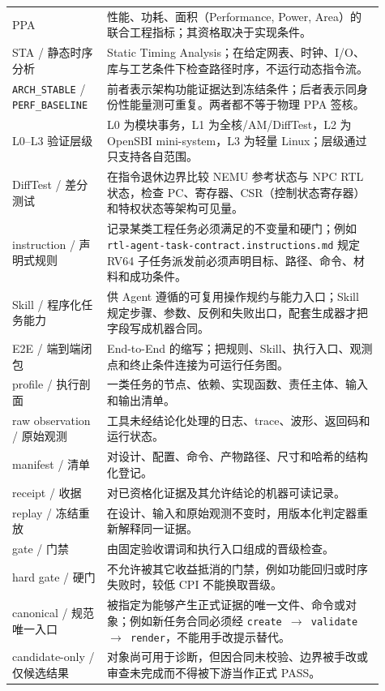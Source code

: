 \documentclass[UTF8,a4paper,zihao=-4,oneside]{ctexart}
\begin{document}
\begin{longtable}{@{}L{0.23\linewidth}L{0.68\linewidth}@{}}
  PPA & 性能、功耗、面积（Performance, Power, Area）的联合工程指标；其资格取决于实现条件。 \\
  STA / 静态时序分析 & Static Timing Analysis；在给定网表、时钟、I/O、库与工艺条件下检查路径时序，不运行动态指令流。 \\
  \texttt{ARCH\_STABLE} / \texttt{PERF\_BASELINE} & 前者表示架构功能证据达到冻结条件；后者表示同身份性能量测可重复。两者都不等于物理 PPA 签核。 \\
  L0--L3 验证层级 & L0 为模块事务，L1 为全核/AM/DiffTest，L2 为 OpenSBI mini-system，L3 为轻量 Linux；层级通过只支持各自范围。 \\
  DiffTest / 差分测试 & 在指令退休边界比较 NEMU 参考状态与 NPC RTL 状态，检查 PC、寄存器、CSR（控制状态寄存器）和特权状态等架构可见量。 \\
  instruction / 声明式规则 & 记录某类工程任务必须满足的不变量和硬门；例如 \texttt{rtl-agent-task-contract.instructions.md} 规定 RV64 子任务派发前必须声明目标、路径、命令、材料和成功条件。 \\
  Skill / 程序化任务能力 & 供 Agent 遵循的可复用操作规约与能力入口；Skill 规定步骤、参数、反例和失败出口，配套生成器才把字段写成机器合同。 \\
  E2E / 端到端闭包 & End-to-End 的缩写；把规则、Skill、执行入口、观测点和终止条件连接为可运行任务图。 \\
  profile / 执行剖面 & 一类任务的节点、依赖、实现函数、责任主体、输入和输出清单。 \\
  raw observation / 原始观测 & 工具未经结论化处理的日志、trace、波形、返回码和运行状态。 \\
  manifest / 清单 & 对设计、配置、命令、产物路径、尺寸和哈希的结构化登记。 \\
  receipt / 收据 & 对已资格化证据及其允许结论的机器可读记录。 \\
  replay / 冻结重放 & 在设计、输入和原始观测不变时，用版本化判定器重新解释同一证据。 \\
  gate / 门禁 & 由固定验收谓词和执行入口组成的晋级检查。 \\
  hard gate / 硬门 & 不允许被其它收益抵消的门禁，例如功能回归或时序失败时，较低 CPI 不能换取晋级。 \\
  canonical / 规范唯一入口 & 被指定为能够产生正式证据的唯一文件、命令或对象；例如新任务合同必须经 \texttt{create $\rightarrow$ validate $\rightarrow$ render}，不能用手改提示替代。 \\
  candidate-only / 仅候选结果 & 对象尚可用于诊断，但因合同未校验、边界被手改或审查未完成而不得被下游当作正式 PASS。 \\

\end{longtable}
\end{document}
